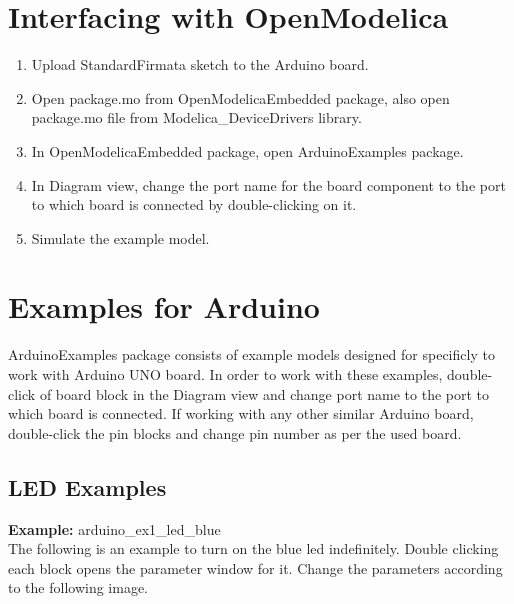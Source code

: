 \documentclass[12pt,a4paper]{report}
\begin{document}
\section{Interfacing with OpenModelica}
\begin{enumerate}
\item Upload StandardFirmata sketch to the Arduino board.
\item Open package.mo from OpenModelicaEmbedded package, also open package.mo file from Modelica\_DeviceDrivers library.
\item In OpenModelicaEmbedded package, open ArduinoExamples package.
\item In Diagram view, change the port name for the board component to the port to which board is connected by double-clicking on it.
\item Simulate the example model.	
\end{enumerate}

\section{Examples for Arduino}
ArduinoExamples package consists of example models designed for specificly to work with Arduino UNO board. In order to work with these examples, double-click of board block in the Diagram view and change port name to the port to which board is connected. If working with any other similar Arduino board, double-click the pin blocks and change pin number as per the used board.

\subsection{LED Examples}
\textbf{Example:} arduino\_ex1\_led\_blue\\

The following is an example to turn on the blue led indefinitely. Double clicking each block opens the parameter window for it. Change the parameters according to the following image.
\end{document}
